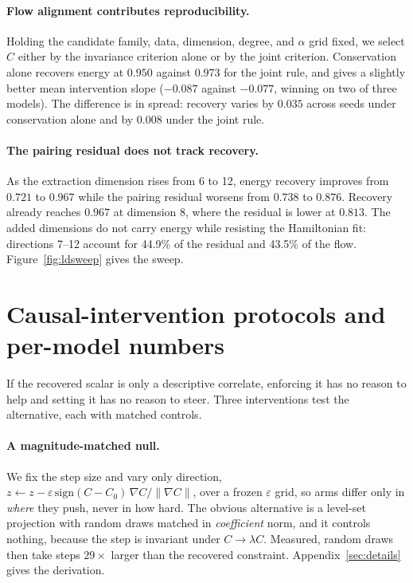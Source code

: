\paragraph{Flow alignment contributes reproducibility.} Holding the candidate family, data,
dimension, degree, and $\alpha$ grid fixed, we select $C$ either by the invariance criterion alone or
by the joint criterion. Conservation alone recovers energy at $0.950$ against $0.973$ for the joint
rule, and gives a slightly better mean intervention slope ($-0.087$ against $-0.077$, winning on two
of three models). The difference is in spread: recovery varies by $0.035$ across seeds under
conservation alone and by $0.008$ under the joint rule.

\paragraph{The pairing residual does not track recovery.} As the extraction dimension rises from 6 to
12, energy recovery improves from $0.721$ to $0.967$ while the pairing residual worsens from $0.738$
to $0.876$. Recovery already reaches $0.967$ at dimension 8, where the residual is lower at $0.813$.
The added dimensions do not carry energy while resisting the Hamiltonian fit: directions 7--12
account for 44.9\% of the residual and 43.5\% of the flow. Figure~\ref{fig:ldsweep} gives the sweep.

\section{Causal-intervention protocols and per-model numbers}
\label{sec:causal-detail}

If the recovered scalar is only a descriptive correlate, enforcing it has no reason to help and
setting it has no reason to steer. Three interventions test the alternative, each with matched
controls.

\paragraph{A magnitude-matched null.}
We fix the step size and vary only direction,
$z \leftarrow z - \varepsilon\,\mathrm{sign}(C - C_0)\,\nabla C / \lVert \nabla C \rVert$, over a
frozen $\varepsilon$ grid, so arms differ only in \emph{where} they push, never in how hard. The
obvious alternative is a level-set projection with random draws matched in \emph{coefficient} norm,
and it controls nothing, because the step is invariant under $C \to \lambda C$. Measured, random
draws then take steps $29\times$ larger than the recovered constraint. Appendix~\ref{sec:details}
gives the derivation.

